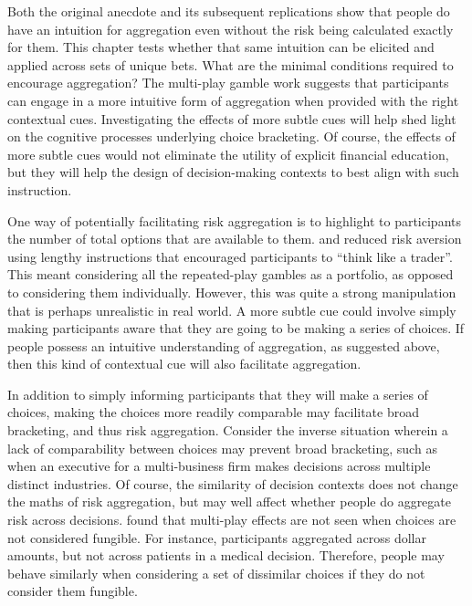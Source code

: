 \documentclass[a4paper, nobind]{templates/ociamthesis}
\theoremstyle{definition}
\theoremstyle{definition}
\theoremstyle{definition}
\theoremstyle{definition}
\theoremstyle{remark}
\begin{document}
Both the original \textcite{samuelson1963} anecdote and its subsequent replications show
that people do have an intuition for aggregation even without the risk being
calculated exactly for them. This chapter tests whether that same intuition can
be elicited and applied across sets of unique bets. What are the minimal
conditions required to encourage aggregation? The multi-play gamble work
suggests that participants can engage in a more intuitive form of aggregation
when provided with the right contextual cues. Investigating the effects of more
subtle cues will help shed light on the cognitive processes underlying choice
bracketing. Of course, the effects of more subtle cues would not eliminate the
utility of explicit financial education, but they will help the design of
decision-making contexts to best align with such instruction.

One way of potentially facilitating risk aggregation is to highlight to
participants the number of total options that are available to them.
\textcite{sokolhessner2009} and \textcite{sokolhessner2012} reduced risk aversion using lengthy
instructions that encouraged participants to ``think like a trader''. This meant
considering all the repeated-play gambles as a portfolio, as opposed to
considering them individually. However, this was quite a strong manipulation
that is perhaps unrealistic in real world. A more subtle cue could involve
simply making participants aware that they are going to be making a series of
choices. If people possess an intuitive understanding of aggregation, as
suggested above, then this kind of contextual cue will also facilitate
aggregation.

In addition to simply informing participants that they will make a series of
choices, making the choices more readily comparable may facilitate broad
bracketing, and thus risk aggregation. Consider the inverse situation wherein a
lack of comparability between choices may prevent broad bracketing, such as when
an executive for a multi-business firm makes decisions across multiple distinct
industries. Of course, the similarity of decision contexts does not change the
maths of risk aggregation, but may well affect whether people do aggregate risk
across decisions. \textcite{dekay2005} found that multi-play effects are not seen when
choices are not considered fungible. For instance, participants aggregated
across dollar amounts, but not across patients in a medical decision. Therefore,
people may behave similarly when considering a set of dissimilar choices if they
do not consider them fungible.
\end{document}
